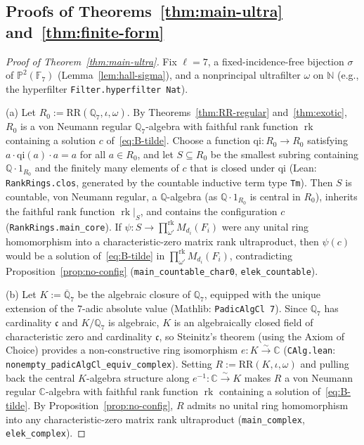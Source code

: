 \documentclass[11pt]{article}
\theoremstyle{definition}
\theoremstyle{remark}
\numberwithin{equation}{section}
\DeclareMathOperator{\rk}{rk}
\newcommand{\RR}{\mathrm{RR}}
\newcommand{\RUF}[3]{\prod_{#1}^{\mathrm{rk}} M_{#2}(#3)}
\newcommand{\Q}{\mathbb{Q}}
\newcommand{\C}{\mathbb{C}}
\newcommand{\N}{\mathbb{N}}
\newcommand{\F}{\mathbb{F}}
\newcommand{\1}{\mathbf{1}}
\newcommand{\code}[1]{{\normalfont\small\texttt{#1}}}
\begin{document}
\subsection{Proofs of Theorems~\ref{thm:main-ultra} and~\ref{thm:finite-form}}

\begin{proof}[Proof of Theorem~\ref{thm:main-ultra}]
Fix $\ell = 7$, a fixed-incidence-free bijection $\sigma$ of $\mathbb{P}^2(\F_7)$ (Lemma~\ref{lem:hall-sigma}), and a nonprincipal ultrafilter $\omega$ on $\N$ (e.g., the hyperfilter \code{Filter.hyperfilter Nat}).

(a) Let $R_0 := \RR(\Q_7, \iota, \omega)$. By Theorems~\ref{thm:RR-regular} and~\ref{thm:exotic}, $R_0$ is a von Neumann regular $\Q_7$-algebra with faithful rank function $\rk$ containing a solution $c$ of~\eqref{eq:B-tilde}. Choose a function $\mathrm{qi}\colon R_0 \to R_0$ satisfying $a \cdot \mathrm{qi}(a) \cdot a = a$ for all $a \in R_0$, and let $S \subseteq R_0$ be the smallest subring containing $\Q \cdot 1_{R_0}$ and the finitely many elements of $c$ that is closed under $\mathrm{qi}$ (Lean: \code{RankRings.clos}, generated by the countable inductive term type \code{Tm}). Then $S$ is countable, von Neumann regular, a $\Q$-algebra (as $\Q \cdot 1_{R_0}$ is central in $R_0$), inherits the faithful rank function $\rk|_S$, and contains the configuration $c$ (\code{RankRings.main\_core}). If $\psi\colon S \to \RUF{\omega'}{d_i}{F_i}$ were any unital ring homomorphism into a characteristic-zero matrix rank ultraproduct, then $\psi(c)$ would be a solution of~\eqref{eq:B-tilde} in $\RUF{\omega'}{d_i}{F_i}$, contradicting Proposition~\ref{prop:no-config} (\code{main\_countable\_char0}, \code{elek\_countable}).

(b) Let $K := \overline{\Q}_7$ be the algebraic closure of $\Q_7$, equipped with the unique extension of the $7$-adic absolute value (Mathlib: \code{PadicAlgCl 7}). Since $\Q_7$ has cardinality $\mathfrak{c}$ and $K/\Q_7$ is algebraic, $K$ is an algebraically closed field of characteristic zero and cardinality $\mathfrak{c}$, so Steinitz's theorem (using the Axiom of Choice) provides a non-constructive ring isomorphism $e\colon K \xrightarrow{\sim} \C$ (\code{CAlg.lean}: \code{nonempty\_padicAlgCl\_equiv\_complex}). Setting $R := \RR(K, \iota, \omega)$ and pulling back the central $K$-algebra structure along $e^{-1}\colon \C \xrightarrow{\sim} K$ makes $R$ a von Neumann regular $\C$-algebra with faithful rank function $\rk$ containing a solution of~\eqref{eq:B-tilde}. By Proposition~\ref{prop:no-config}, $R$ admits no unital ring homomorphism into any characteristic-zero matrix rank ultraproduct (\code{main\_complex}, \code{elek\_complex}).
\end{proof}
\end{document}
